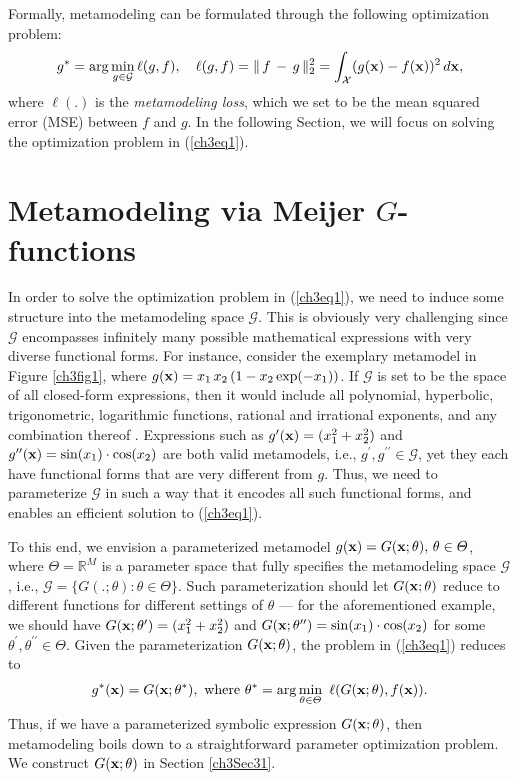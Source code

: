 \documentclass [PhD] {uclathes}
\begin{document}
Formally, metamodeling can be formulated through the following optimization problem:  
\begin{align}
g^* = \arg \min_{g \in \mathcal{G}} \ell(g, f),\,\,\,\,\,\, \ell(g, f) = \|\,f\, - \,g\,\|_2^2 = \int_{\mathcal{X}} (g({\bf x}) - f({\bf x}))^2\, d{\bf x},
\label{ch3eq1}
\end{align}
where $\ell(.)$ is the {\it metamodeling loss}, which we set to be the mean squared error (MSE) between $f$ and $g$. In the following Section, we will focus on solving the optimization problem in (\ref{ch3eq1}).

\section{Metamodeling via Meijer $G$-functions}
\label{ch3sec3}
In order to solve the optimization problem in (\ref{ch3eq1}), we need to induce some structure into the metamodeling space $\mathcal{G}$. This is obviously very challenging since $\mathcal{G}$ encompasses infinitely many possible mathematical expressions with very diverse functional forms. For instance, consider the exemplary metamodel in Figure \ref{ch3fig1}, where $g({\bf x}) = x_1\,x_2\,(1-x_2\exp(-x_1))$. If $\mathcal{G}$ is set to be the space of all closed-form expressions, then it would include all polynomial, hyperbolic, trigonometric, logarithmic functions, rational and irrational exponents, and any combination thereof \cite{chow1999closed,borwein2013closed}. Expressions such as $g^{\prime}({\bf x}) = (x^2_1 + x^2_2)$ and $g^{\prime\prime}({\bf x}) = \sin(x_1)\cdot \cos(x_2)$ are both valid metamodels, i.e., $g^{\prime}, g^{\prime\prime} \in \mathcal{G}$, yet they each have functional forms that are very different from $g$. Thus, we need to parameterize $\mathcal{G}$ in such a way that it encodes all such functional forms, and enables an efficient solution to (\ref{ch3eq1}). 

To this end, we envision a parameterized metamodel $g({\bf x}) = G({\bf x};\theta),\, \theta \in \Theta$, where $\Theta = \mathbb{R}^M$ is a parameter space that fully specifies the metamodeling space $\mathcal{G}$, i.e., $\mathcal{G} = \{G(.;\theta): \theta \in \Theta\}$. Such parameterization should let $G({\bf x};\theta)$ reduce to different functions for different settings of $\theta$ --- for the aforementioned example, we should have $G({\bf x};\theta^{\prime}) = (x^2_1 + x^2_2)$ and $G({\bf x};\theta^{\prime\prime}) = \sin(x_1)\cdot \cos(x_2)$ for some $\theta^{\prime}, \theta^{\prime\prime} \in \Theta$. Given the parameterization $G({\bf x};\theta)$, the problem in (\ref{ch3eq1}) reduces to  
\begin{align}
g^*({\bf x}) = G({\bf x};\theta^*),\,\,\mbox{where}\,\, \theta^* = \arg \min_{\theta \in \Theta}\,\, \ell(G({\bf x};\theta), f({\bf x})).
\label{ch3eq2}
\end{align}
Thus, if we have a parameterized symbolic expression $G({\bf x};\theta)$, then metamodeling boils down to a straightforward parameter optimization problem. We construct $G({\bf x};\theta)$ in Section \ref{ch3Sec31}.
\end{document}
